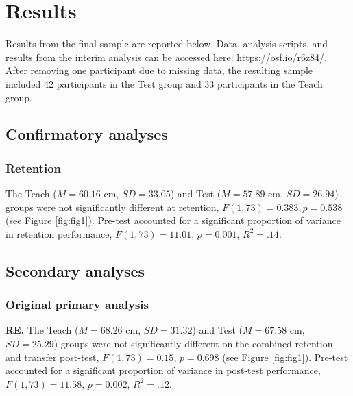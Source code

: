 \documentclass[
  english,
  man,floatsintext]{apa7}
\begin{document}
\hypertarget{results}{%
\section{Results}\label{results}}

Results from the final sample are reported below. Data, analysis scripts, and results from the interim analysis can be accessed here: \url{https://osf.io/r6z84/}. After removing one participant due to missing data, the resulting sample included 42 participants in the Test group and 33 participants in the Teach group.

\hypertarget{confirmatory-analyses}{%
\subsection{Confirmatory analyses}\label{confirmatory-analyses}}

\hypertarget{retention}{%
\subsubsection{Retention}\label{retention}}

The Teach (\(M = 60.16\) cm, \(SD = 33.05\)) and Test (\(M = 57.89\) cm, \(SD = 26.94\)) groups were not significantly different at retention, \(F(1,73) = 0.383, p = 0.538\) (see Figure \ref{fig:fig1}). Pre-test accounted for a significant proportion of variance in retention performance, \(F(1,73) = 11.01\), \(p = 0.001\), \(R^{2} = .14\).



\hypertarget{secondary-analyses}{%
\subsection{Secondary analyses}\label{secondary-analyses}}

\hypertarget{original-primary-analysis}{%
\subsubsection{Original primary analysis}\label{original-primary-analysis}}

\textbf{RE.} The Teach (\(M = 68.26\) cm, \(SD = 31.32\)) and Test (\(M = 67.58\) cm, \(SD = 25.29\)) groups were not significantly different on the combined retention and transfer post-test, \(F(1,73) = 0.15\), \(p = 0.698\) (see Figure \ref{fig:fig1}). Pre-test accounted for a significant proportion of variance in post-test performance, \(F(1,73) = 11.58\), \(p = 0.002\), \(R^{2} = .12\).
\end{document}
